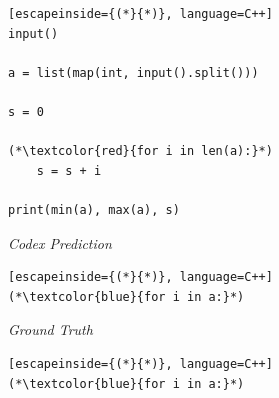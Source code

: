 \documentclass[12pt,a4paper]{report}
\begin{document}
\begin{appendices}
\begin{lstlisting}[escapeinside={(*}{*)}, language=C++]
input()

a = list(map(int, input().split()))

s = 0

(*\textcolor{red}{for i in len(a):}*)
    s = s + i

print(min(a), max(a), s)
\end{lstlisting}

\textit{Codex Prediction}

\begin{lstlisting}[escapeinside={(*}{*)}, language=C++]
(*\textcolor{blue}{for i in a:}*)
\end{lstlisting}

\textit{Ground Truth}

\begin{lstlisting}[escapeinside={(*}{*)}, language=C++]
(*\textcolor{blue}{for i in a:}*)
\end{lstlisting}

\end{appendices}
\end{document}
